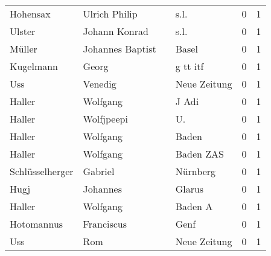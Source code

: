 \begin{center}
\begin{tiny}
\begin{longtabu}{llllrr}
                 Hohensax &                      Ulrich Philip &             &                                        s.l. &          0 &         1 \\
                   Ulster &                      Johann Konrad &             &                                        s.l. &          0 &         1 \\
                   Müller &                   Johannes Baptist &             &                                       Basel &          0 &         1 \\
                Kugelmann &                              Georg &             &                                    g tt itf &          0 &         1 \\
                      Uss &                            Venedig &             &                                Neue Zeitung &          0 &         1 \\
                   Haller &                           Wolfgang &             &                                       J Adi &          0 &         1 \\
                   Haller &                         Wolfjpeepi &             &                                         U.  &          0 &         1 \\
                   Haller &                           Wolfgang &             &                                       Baden &          0 &         1 \\
                   Haller &                           Wolfgang &             &                                   Baden ZAS &          0 &         1 \\
          Schlüsselherger &                            Gabriel &             &                                    Nürnberg &          0 &         1 \\
                     Hugj &                           Johannes &             &                                      Glarus &          0 &         1 \\
                   Haller &                           Wolfgang &             &                                     Baden A &          0 &         1 \\
               Hotomannus &                         Franciscus &             &                                        Genf &          0 &         1 \\
                      Uss &                                Rom &             &                                Neue Zeitung &          0 &         1 \\

\end{longtabu}
\end{tiny}
\end{center}
